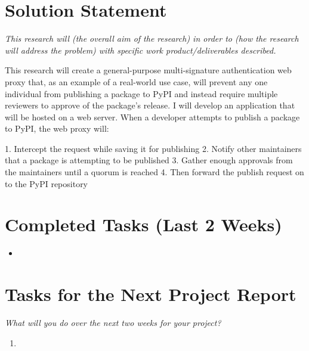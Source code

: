 \documentclass[12pt]{article}
\newcommand{\instruction}[1]{{\small\itshape #1}}
\begin{document}
\section*{Solution Statement}

\instruction{This research will (the overall aim of the research) in order to (how the research will address the problem) with specific work product/deliverables described.}

This research will create a general-purpose multi-signature authentication web proxy that, as an example of a real-world use case, will prevent any one individual from publishing a package to PyPI and instead require multiple reviewers to approve of the package's release. I will develop an application that will be hosted on a web server. When a developer attempts to publish a package to PyPI, the web proxy will:

1. Intercept the request while saving it for publishing
2. Notify other maintainers that a package is attempting to be published
3. Gather enough approvals from the maintainers until a quorum is reached
4. Then forward the publish request on to the PyPI repository

\section*{Completed Tasks (Last 2 Weeks)}

\begin{itemize}[leftmargin=1.5em, itemsep=2pt]
  \item
\end{itemize}

\section*{Tasks for the Next Project Report}

\instruction{What will you do over the next two weeks for your project?}

\begin{enumerate}[leftmargin=1.5em, itemsep=2pt]
  \item
\end{enumerate}
\end{document}
